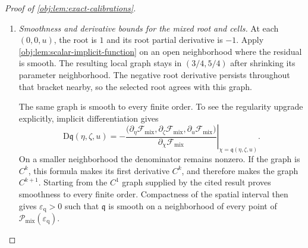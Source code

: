 \begin{proof}[Proof of \cref{obj:lem:exact-calibrations}]
\begin{enumerate}
\item \emph{Smoothness and derivative bounds for the mixed root and cells.}
At each \((0,0,u)\), the root is \(1\) and its root partial derivative is \(-1\). Apply \cref{obj:lem:scalar-implicit-function} on an open neighborhood where the residual is smooth. The resulting local graph stays in \((3/4,5/4)\) after shrinking its parameter neighborhood. The negative root derivative persists throughout that bracket nearby, so the selected root agrees with this graph.

The same graph is smooth to every finite order. To see the regularity upgrade explicitly, implicit differentiation gives
\[
\mathrm D\mathfrak q(\eta,\zeta,u)
=
-\left.
\frac{
\bigl(\partial_\eta\mathcal F_{\mathrm{mix}},
      \partial_\zeta\mathcal F_{\mathrm{mix}},
      \partial_u\mathcal F_{\mathrm{mix}}\bigr)}
{\partial_\chi\mathcal F_{\mathrm{mix}}}
\right|_{\chi=\mathfrak q(\eta,\zeta,u)} .
\]
On a smaller neighborhood the denominator remains nonzero. If the graph is \(C^k\), this formula makes its first derivative \(C^k\), and therefore makes the graph \(C^{k+1}\). Starting from the \(C^1\) graph supplied by the cited result proves smoothness to every finite order. Compactness of the spatial interval then gives
\(\varepsilon_{\mathrm q}>0\) such that \(\mathfrak q\) is smooth on a neighborhood of every point of
\(\mathcal P_{\mathrm{mix}}(\varepsilon_{\mathrm q})\).


\end{enumerate}
\end{proof}
